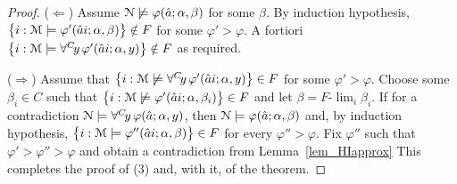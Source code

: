\documentclass[12pt,letterpaper,oneside,reqno]{amsart}
\theoremstyle{plain}
\theoremstyle{remark}
\begin{document}
\begin{proof}
  ($\Leftarrow$) Assume ${\EuScript N}\not\models\varphi(\hat a; \alpha, \beta)$ for some $\beta$.
  By induction hypothesis, $\big\{ i: {\EuScript M}\models\varphi'(\hat ai;\alpha,\beta)\big\}\notin F$ for some $\varphi'>\varphi$.
  A fortiori $\big\{ i:{\EuScript M}\models\forall^C\!y\,\varphi'(\hat ai;\alpha,y)\big\}\notin F$ as required.

  ($\Rightarrow$) Assume that $\big\{ i:{\EuScript M}\not\models\forall^C\!y\,\varphi'(\hat ai;\alpha,y)\big\}\in F$ for some $\varphi'>\varphi$.
  Choose some $\beta_i\in C$ such that $\big\{ i:{\EuScript M}\not\models\varphi'(\hat ai;\alpha,\beta_i)\big\}\in F$ and let $\beta=F\mbox{-}\lim_i\beta_i$.
  If for a contradiction ${\EuScript N}\models\forall^C\!y\,\varphi(\hat a; \alpha, y)$, 
  then ${\EuScript N}\models\varphi(\hat a; \alpha, \beta)$ and, by induction hypothesis, $\big\{ i:{\EuScript M}\models\varphi''(\hat ai;\alpha,\beta)\big\}\in F$ for every $\varphi''>\varphi$.
  Fix $\varphi''$ such that $\varphi'>\varphi''>\varphi$ and obtain a contradiction from Lemma~\ref{lem_HIapprox} 
  This completes the proof of (3) and, with it, of the theorem.
\end{proof}
\end{document}
